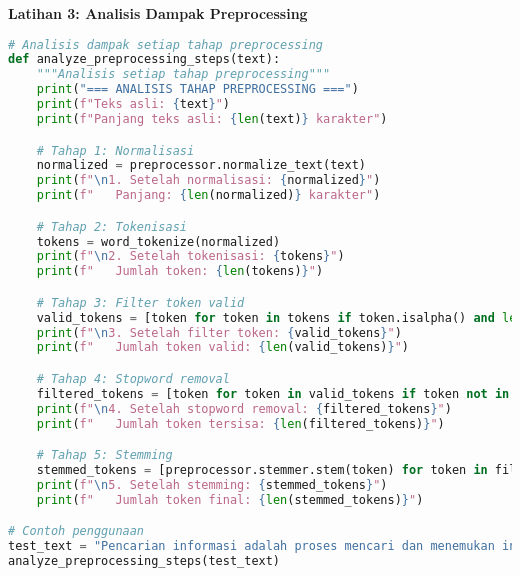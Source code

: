 \textbf{Latihan 3: Analisis Dampak Preprocessing}

\begin{lstlisting}[language=python, style=python]
# Analisis dampak setiap tahap preprocessing
def analyze_preprocessing_steps(text):
    """Analisis setiap tahap preprocessing"""
    print("=== ANALISIS TAHAP PREPROCESSING ===")
    print(f"Teks asli: {text}")
    print(f"Panjang teks asli: {len(text)} karakter")

    # Tahap 1: Normalisasi
    normalized = preprocessor.normalize_text(text)
    print(f"\n1. Setelah normalisasi: {normalized}")
    print(f"   Panjang: {len(normalized)} karakter")

    # Tahap 2: Tokenisasi
    tokens = word_tokenize(normalized)
    print(f"\n2. Setelah tokenisasi: {tokens}")
    print(f"   Jumlah token: {len(tokens)}")

    # Tahap 3: Filter token valid
    valid_tokens = [token for token in tokens if token.isalpha() and len(token) > 2]
    print(f"\n3. Setelah filter token: {valid_tokens}")
    print(f"   Jumlah token valid: {len(valid_tokens)}")

    # Tahap 4: Stopword removal
    filtered_tokens = [token for token in valid_tokens if token not in preprocessor.stopwords]
    print(f"\n4. Setelah stopword removal: {filtered_tokens}")
    print(f"   Jumlah token tersisa: {len(filtered_tokens)}")

    # Tahap 5: Stemming
    stemmed_tokens = [preprocessor.stemmer.stem(token) for token in filtered_tokens]
    print(f"\n5. Setelah stemming: {stemmed_tokens}")
    print(f"   Jumlah token final: {len(stemmed_tokens)}")

# Contoh penggunaan
test_text = "Pencarian informasi adalah proses mencari dan menemukan informasi yang relevan dari kumpulan dokumen."
analyze_preprocessing_steps(test_text)
\end{lstlisting}